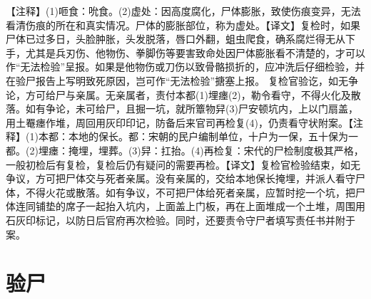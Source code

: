 \documentclass[12pt,UTF8]{ctexbook}
\begin{document}
【注释】(1)咂食：吮食。(2)虚处：因高度腐化，尸体膨胀，致使伤痕变异，无法看清伤痕的所在和真实情况。尸体的膨胀部位，称为虚处。【译文】复检时，如果尸体已过多日，头脸肿胀，头发脱落，唇口外翻，蛆虫爬食，确系腐烂得无从下手，尤其是兵刃伤、他物伤、拳脚伤等要害致命处因尸体膨胀看不清楚的，才可以作“无法检验”呈报。如果是他物伤或刀伤以致骨骼损折的，应冲洗后仔细检验，并在验尸报告上写明致死原因，岂可作“无法检验”搪塞上报。
复检官验讫，如无争论，方可给尸与亲属。无亲属者，责付本都(1)埋瘗(2)，勒令看守，不得火化及散落。如有争论，未可给尸，且掘一坑，就所簟物舁(3)尸安顿坑内，上以门扇盖，用土罨瘗作堆，周回用灰印印记，防备后来官司再检复(4)，仍责看守状附案。【注释】(1)本都：本地的保长。都：宋朝的民户编制单位，十户为一保，五十保为一都。(2)埋瘗：掩埋，埋葬。(3)舁：扛抬。(4)再检复：宋代的尸检制度极其严格，一般初检后有复检，复检后仍有疑问的需要再检。【译文】复检官检验结束，如无争议，方可把尸体交与死者亲属。没有亲属的，交给本地保长掩埋，并派人看守尸体，不得火花或散落。如有争议，不可把尸体给死者亲属，应暂时挖一个坑，把尸体连同铺垫的席子一起抬入坑内，上面盖上门板，再在上面堆成一个土堆，周围用石灰印标记，以防日后官府再次检验。同时，还要责令守尸者填写责任书并附于案。

\chapter{验尸}
\end{document}
